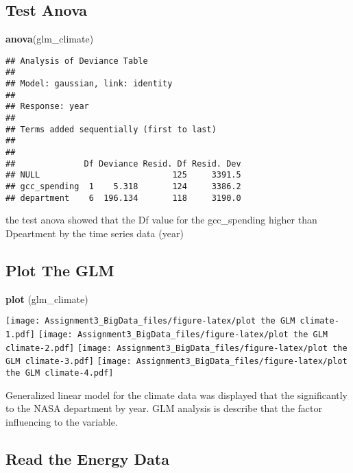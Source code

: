\documentclass[]{article}
\newenvironment{Shaded}{\begin{snugshade}}{\end{snugshade}}
\newcommand{\KeywordTok}[1]{\textcolor[rgb]{0.13,0.29,0.53}{\textbf{#1}}}
\newcommand{\NormalTok}[1]{#1}
\begin{document}
\subsection{Test Anova}\label{test-anova}

\begin{Shaded}
\begin{Highlighting}[]
\KeywordTok{anova}\NormalTok{(glm_climate)}
\end{Highlighting}
\end{Shaded}

\begin{verbatim}
## Analysis of Deviance Table
## 
## Model: gaussian, link: identity
## 
## Response: year
## 
## Terms added sequentially (first to last)
## 
## 
##              Df Deviance Resid. Df Resid. Dev
## NULL                           125     3391.5
## gcc_spending  1    5.318       124     3386.2
## department    6  196.134       118     3190.0
\end{verbatim}

the test anova showed that the Df value for the gcc\_spending higher
than Dpeartment by the time series data (year)

\subsection{Plot The GLM}\label{plot-the-glm}

\begin{Shaded}
\begin{Highlighting}[]
\KeywordTok{plot}\NormalTok{ (glm_climate)}
\end{Highlighting}
\end{Shaded}

\texttt{[image: Assignment3\_BigData\_files/figure-latex/plot the GLM climate-1.pdf]}
\texttt{[image: Assignment3\_BigData\_files/figure-latex/plot the GLM climate-2.pdf]}
\texttt{[image: Assignment3\_BigData\_files/figure-latex/plot the GLM climate-3.pdf]}
\texttt{[image: Assignment3\_BigData\_files/figure-latex/plot the GLM climate-4.pdf]}

Generalized linear model for the climate data was displayed that the
significantly to the NASA department by year. GLM analysis is describe
that the factor influencing to the variable.

\subsection{Read the Energy Data}\label{read-the-energy-data}
\end{document}

